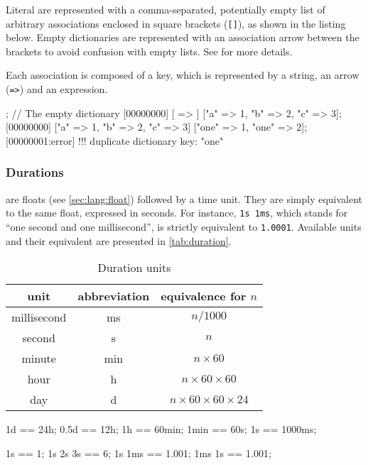 
Literal  are represented with a comma-separated,
potentially empty list of arbitrary associations enclosed in square brackets
(\lstinline|[]|), as shown in the listing below.  Empty dictionaries are
represented with an association arrow between the brackets to avoid
confusion with empty lists.  See  for more details.

Each association is composed of a key, which is represented by a string, an
arrow (\lstinline|=>|) and an expression.

\begin{urbiscript}
[ => ]; // The empty dictionary
[00000000] [ => ]
["a" => 1, "b" => 2, "c" => 3];
[00000000] ["a" => 1, "b" => 2, "c" => 3]
["one" => 1, "one" => 2];
[00000001:error] !!! duplicate dictionary key: "one"
\end{urbiscript}

\subsubsection{Durations}

 are floats (see \autoref{sec:lang:float})
followed by a time unit. They are simply equivalent to the same float,
expressed in seconds. For instance, \lstinline|1s 1ms|, which stands
for ``one second and one millisecond'', is strictly equivalent to
\lstinline|1.0001|. Available units and their equivalent are presented
in \autoref{tab:duration}.

\begin{table}
  \centering
  \begin{tabular}{|c|c|c|}
    \hline
    unit        & abbreviation & equivalence for $n$  \\
    \hline
    millisecond & ms           & $n / 1000$         \\
    second      & s            & $n$                \\
    minute      & min          & $n \times 60$           \\
    hour        & h            & $n \times 60 \times 60$      \\
    day         & d            & $n \times 60 \times 60 \times 24$ \\
    \hline
  \end{tabular}
  \caption{Duration units}
  \label{tab:duration}
\end{table}

\begin{urbiassert}
1d   == 24h;
0.5d == 12h;
1h   == 60min;
1min == 60s;
1s   == 1000ms;


1s == 1;
1s 2s 3s == 6;
1s 1ms == 1.001;
1ms 1s == 1.001;
\end{urbiassert}

